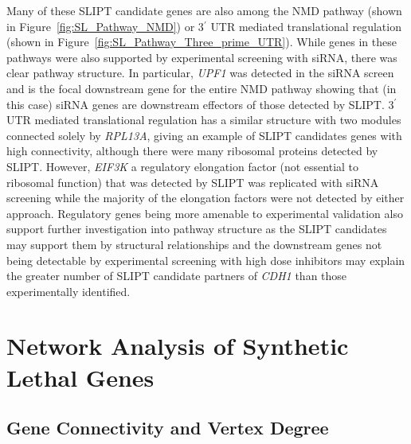 Many of these \gls{SLIPT} candidate genes are also among the \gls{NMD} pathway (shown in Figure~\ref{fig:SL_Pathway_NMD}) or 3$^\prime$ \gls{UTR} mediated translational regulation (shown in Figure~\ref{fig:SL_Pathway_Three_prime_UTR}). While genes in these pathways were also supported by experimental screening with \gls{siRNA}, there was clear pathway structure. In particular, \textit{UPF1} was detected in the \gls{siRNA} screen and is the focal downstream gene for the entire \gls{NMD} pathway showing that (in this case) \gls{siRNA} genes are downstream effectors of those detected by \gls{SLIPT}.  3$^\prime$ \gls{UTR} mediated translational regulation has a similar structure with two modules connected solely by \textit{RPL13A}, giving an example of \gls{SLIPT} candidates genes with high connectivity, although there were many ribosomal proteins detected by \gls{SLIPT}. However, \textit{EIF3K} a regulatory elongation factor (not essential to ribosomal function) that was detected by \gls{SLIPT} was replicated with \gls{siRNA} screening while the majority of the elongation factors were not detected by either approach. Regulatory genes being more amenable to experimental validation also support further investigation into pathway structure as the \gls{SLIPT} candidates may support them by structural relationships and the downstream genes not being detectable by experimental screening with high dose inhibitors may explain the greater number of \gls{SLIPT} candidate partners of \textit{CDH1} than those experimentally identified.


\FloatBarrier

\section{Network Analysis of Synthetic Lethal Genes}   \label{chapt4:Network_Test}

\FloatBarrier

\subsection{Gene Connectivity and Vertex Degree}  \label{chapt4:Network_Vertex_Degree}

\begin{figure*}[!htp]
\begin{mdframed}
  \begin{center}
  \resizebox{0.95 \textwidth}{!}{
    \fbox{
    \texttt{[image: \{"/home/tomkelly/Downloads/Pathway\_Structure/Centrality\_exprSL/Pi3K\_network\_vertex\_degree".png]}}
   }
   }
   \end{center}
   \caption[Synthetic Lethality and Vertex Degree]{\small \textbf{Synthetic Lethality and Vertex Degree.} Synthetic Lethality and Vertex Degree
}
\label{fig:SL_Pathway_PI3K_Vertex_Degree}
\end{mdframed}
\end{figure*}

